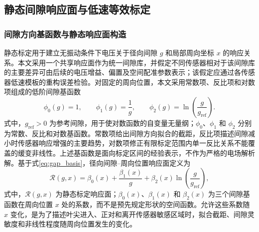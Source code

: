\documentclass[UTF8,12pt,a4paper]{ctexart}
\newcommand{\Rcal}{\mathcal{R}}
\begin{document}
\subsection{静态间隙响应面与低速等效标定}

\subsubsection{间隙方向基函数与静态响应面构造}

静态标定用于建立无振动条件下电压关于径向间隙 $g$ 和局部周向坐标 $x$ 的响应关系。本文采用一个共享响应面作为统一间隙库，并假定不同传感器相对于该间隙库的主要差异可由后续的电压增益、偏置及空间配准参数表示；该假定应通过各传感器低速模板的重构误差检验。对固定的周向位置，本文采用常数项、反比项和对数项组成的低阶间隙基函数
\begin{equation}
\phi_0(g)=1,
\qquad
\phi_1(g)=\frac{1}{g},
\qquad
\phi_2(g)=\ln\left(\frac{g}{g_{\mathrm{ref}}}\right).
\label{eq:gap_basis}
\end{equation}
式中，$g_{\mathrm{ref}}>0$ 为参考间隙，用于使对数函数的自变量无量纲；$\phi_0$、$\phi_1$ 和 $\phi_2$ 分别为常数、反比和对数基函数。常数项给出间隙方向拟合的截距，反比项描述间隙减小时传感器响应增强的主要趋势，对数项修正有限标定范围内单一反比关系不能覆盖的缓变非线性。上述基函数是面向标定区间的经验表示，不作为严格的电场解析解。基于式\eqref{eq:gap_basis}，径向间隙--周向位置响应面定义为
\begin{equation}
\Rcal(g,x)
=\beta_0(x)+\frac{\beta_1(x)}{g}
+\beta_2(x)\ln\left(\frac{g}{g_{\mathrm{ref}}}\right),
\label{eq:response_surface}
\end{equation}
式中，$\Rcal(g,x)$ 为静态标定响应面；$\beta_0(x)$、$\beta_1(x)$ 和 $\beta_2(x)$ 为三个间隙基函数在周向位置 $x$ 处的系数，而不是预先规定形状的空间函数。允许这些系数随 $x$ 变化，是为了描述叶尖进入、正对和离开传感器敏感区域时，拟合截距、间隙灵敏度和非线性程度随周向位置发生的变化。
\end{document}
